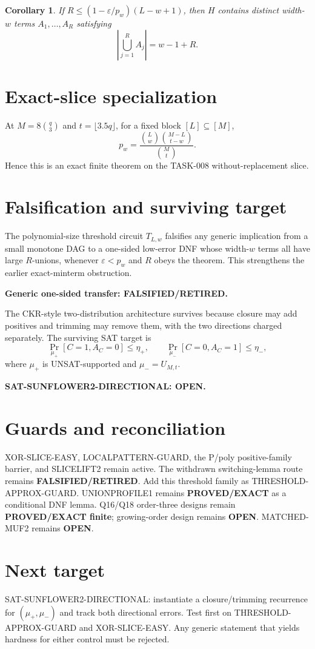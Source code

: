 \documentclass[11pt]{article}
\newtheorem{corollary}{Corollary}
\begin{document}
\begin{corollary}
If \(R\le(1-\varepsilon/p_w)(L-w+1)\), then \(H\) contains distinct width-\(w\) terms \(A_1,\ldots,A_R\) satisfying
\[
|\bigcup_{j=1}^{R}A_j|=w-1+R.
\]
\end{corollary}

\section*{Exact-slice specialization}
At \(M=8\binom q3\) and \(t=\lfloor3.5q\rfloor\), for a fixed block \([L]\subseteq[M]\),
\[
p_w=\frac{\binom Lw\binom{M-L}{t-w}}{\binom Mt}.
\]
Hence this is an exact finite theorem on the TASK-008 without-replacement slice.

\section*{Falsification and surviving target}
The polynomial-size threshold circuit \(T_{L,w}\) falsifies any generic implication from a small monotone DAG to a one-sided low-error DNF whose width-\(w\) terms all have large \(R\)-unions, whenever \(\varepsilon<p_w\) and \(R\) obeys the theorem. This strengthens the earlier exact-minterm obstruction.

\textbf{Generic one-sided transfer: FALSIFIED/RETIRED.}

The CKR-style two-distribution architecture survives because closure may add positives and trimming may remove them, with the two directions charged separately. The surviving SAT target is
\[
\Pr_{\mu_+}[C=1,A_C=0]\le\eta_+,
\qquad
\Pr_{\mu_-}[C=0,A_C=1]\le\eta_-,
\]
where \(\mu_+\) is UNSAT-supported and \(\mu_-=U_{M,t}\).

\textbf{SAT-SUNFLOWER2-DIRECTIONAL: OPEN.}

\section*{Guards and reconciliation}
XOR-SLICE-EASY, LOCALPATTERN-GUARD, the P/poly positive-family barrier, and SLICELIFT2 remain active. The withdrawn switching-lemma route remains \textbf{FALSIFIED/RETIRED}. Add this threshold family as THRESHOLD-APPROX-GUARD. UNIONPROFILE1 remains \textbf{PROVED/EXACT} as a conditional DNF lemma. Q16/Q18 order-three designs remain \textbf{PROVED/EXACT finite}; growing-order design remains \textbf{OPEN}. MATCHED-MUF2 remains \textbf{OPEN}.

\section*{Next target}
SAT-SUNFLOWER2-DIRECTIONAL: instantiate a closure/trimming recurrence for \((\mu_+,\mu_-)\) and track both directional errors. Test first on THRESHOLD-APPROX-GUARD and XOR-SLICE-EASY. Any generic statement that yields hardness for either control must be rejected.
\end{document}
